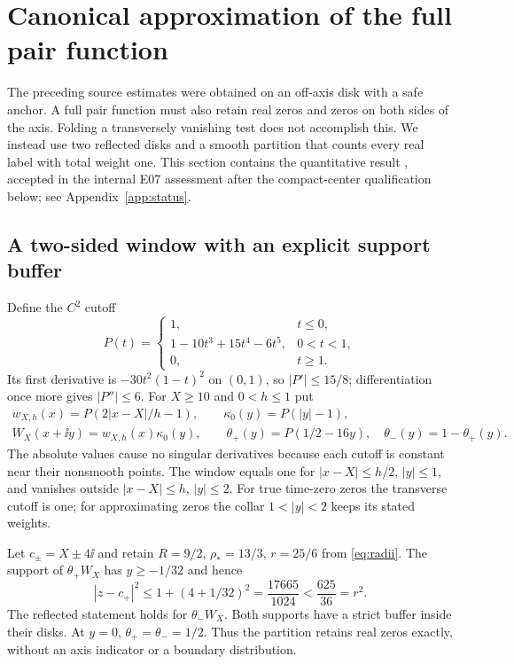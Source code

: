 \section{Canonical approximation of the full pair function}\label{sec:full-pair}

The preceding source estimates were obtained on an off-axis disk with
a safe anchor. A full pair function must also retain real zeros and
zeros on both sides of the axis. Folding a transversely vanishing test
does not accomplish this. We instead use two reflected disks and a
smooth partition that counts every real label with total weight one.
This section contains the quantitative result \cite{OCGaussian},
accepted in the internal E07 assessment after the compact-center
qualification below; see Appendix~\ref{app:status}.

\subsection{A two-sided window with an explicit support buffer}

Define the $C^2$ cutoff
\begin{equation}\label{eq:full-cutoff}
 P(t)=\begin{cases}
 1,&t\le0,\\
 1-10t^3+15t^4-6t^5,&0<t<1,\\
 0,&t\ge1.
 \end{cases}
\end{equation}
Its first derivative is $-30t^2(1-t)^2$ on $(0,1)$, so
$|P'|\le15/8$; differentiation once more gives $|P''|\le6$.
For $X\ge10$ and $0<h\le1$ put
\begin{equation}\label{eq:full-window}
 \begin{gathered}
 w_{X,h}(x)=P(2|x-X|/h-1),\qquad \kappa_0(y)=P(|y|-1),\\
 W_X(x+\ii y)=w_{X,h}(x)\kappa_0(y),\qquad
 \theta_+(y)=P(1/2-16y),\quad\theta_-(y)=1-\theta_+(y).
 \end{gathered}
\end{equation}
The absolute values cause no singular derivatives because each cutoff
is constant near their nonsmooth points. The window equals one for
$|x-X|\le h/2$, $|y|\le1$, and vanishes outside
$|x-X|\le h$, $|y|\le2$. For true time-zero zeros the transverse
cutoff is one; for approximating zeros the collar $1<|y|<2$ keeps
its stated weights.

Let $c_\pm=X\pm4\ii$ and retain $R=9/2$, $\rho_*=13/3$, $r=25/6$
from \eqref{eq:radii}. The support of $\theta_+W_X$ has
$y\ge-1/32$ and hence
\begin{equation}\label{eq:two-disk-buffer}
 |z-c_+|^2\le1+(4+1/32)^2
        =\frac{17665}{1024}<\frac{625}{36}=r^2.
\end{equation}
The reflected statement holds for $\theta_-W_X$. Both supports have a
strict buffer inside their disks. At $y=0$, $\theta_+=\theta_-=1/2$.
Thus the partition retains real zeros exactly, without an axis indicator
or a boundary distribution.

